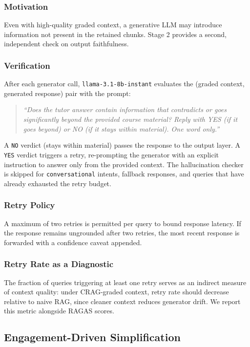 \documentclass[conference]{IEEEtran}
\begin{document}
\subsubsection{Motivation}
Even with high-quality graded context, a generative LLM may
introduce information not present in the retained chunks.
Stage 2 provides a second, independent check on output faithfulness.

\subsubsection{Verification}
After each generator call, \texttt{llama-3.1-8b-instant} evaluates
the (graded context, generated response) pair with the prompt:
\begin{quote}
\textit{``Does the tutor answer contain information that contradicts
or goes significantly beyond the provided course material? Reply
with YES (if it goes beyond) or NO (if it stays within material).
One word only.''}
\end{quote}
A \texttt{NO} verdict (stays within material) passes the response to
the output layer.
A \texttt{YES} verdict triggers a retry, re-prompting the generator
with an explicit instruction to answer only from the provided context.
The hallucination checker is skipped for \texttt{conversational}
intents, fallback responses, and queries that have already exhausted
the retry budget.

\subsubsection{Retry Policy}
A maximum of two retries is permitted per query to bound response
latency.
If the response remains ungrounded after two retries, the most
recent response is forwarded with a confidence caveat appended.

\subsubsection{Retry Rate as a Diagnostic}
The fraction of queries triggering at least one retry serves as an
indirect measure of context quality: under CRAG-graded context,
retry rate should decrease relative to naive RAG, since cleaner
context reduces generator drift.
We report this metric alongside RAGAS scores.

\subsection{Engagement-Driven Simplification}
\label{subsec:engagement}
\end{document}
